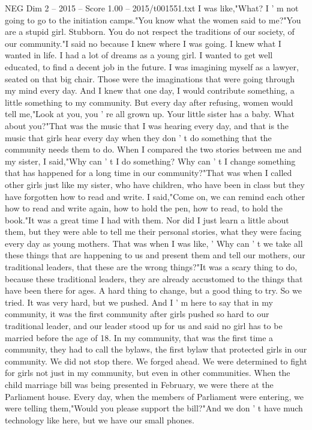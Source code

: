 \begin{textsample}{NEG Dim 2 – 2015 – Score 1.00 – 2015/t001551.txt}
I was like,"What?
I ' m not going to go to the initiation camps."You know what the women said to me?"You are a stupid girl.
Stubborn.
You do not respect the traditions of our society, of our community."I said no because I knew where I was going.
I knew what I wanted in life.
I had a lot of dreams as a young girl.
I wanted to get well educated, to find a decent job in the future.
I was imagining myself as a lawyer, seated on that big chair.
Those were the imaginations that were going through my mind every day.
And I knew that one day, I would contribute something, a little something to my community.
But every day after refusing, women would tell me,"Look at you, you ' re all grown up.
Your little sister has a baby.
What about you?"That was the music that I was hearing every day, and that is the music that girls hear every day when they don ' t do something that the community needs them to do.
When I compared the two stories between me and my sister, I said,"Why can ' t I do something?
Why can ' t I change something that has happened for a long time in our community?"That was when I called other girls just like my sister, who have children, who have been in class but they have forgotten how to read and write.
I said,"Come on, we can remind each other how to read and write again, how to hold the pen, how to read, to hold the book."It was a great time I had with them.
Nor did I just learn a little about them, but they were able to tell me their personal stories, what they were facing every day as young mothers.
That was when I was like, ' Why can ' t we take all these things that are happening to us and present them and tell our mothers, our traditional leaders, that these are the wrong things?"It was a scary thing to do, because these traditional leaders, they are already accustomed to the things that have been there for ages.
A hard thing to change, but a good thing to try.
So we tried.
It was very hard, but we pushed.
And I ' m here to say that in my community, it was the first community after girls pushed so hard to our traditional leader, and our leader stood up for us and said no girl has to be married before the age of 18.
In my community, that was the first time a community, they had to call the bylaws, the first bylaw that protected girls in our community.
We did not stop there.
We forged ahead.
We were determined to fight for girls not just in my community, but even in other communities.
When the child marriage bill was being presented in February, we were there at the Parliament house.
Every day, when the members of Parliament were entering, we were telling them,"Would you please support the bill?"And we don ' t have much technology like here, but we have our small phones.

\end{textsample}
